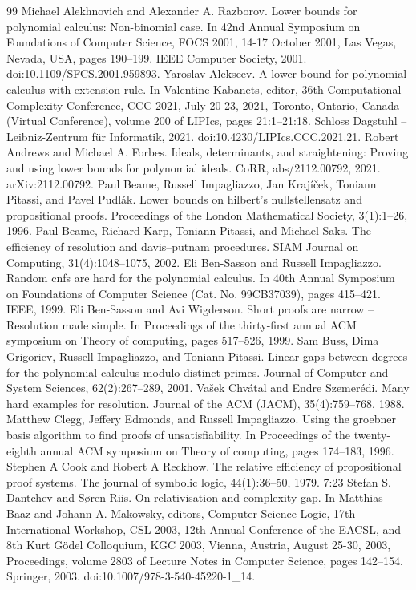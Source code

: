 \documentclass[10pt,a4paper]{article}
\begin{document}
\begin{thebibliography}{99}
 Michael Alekhnovich and Alexander A. Razborov. Lower bounds for polynomial calculus: Non-binomial case. In 42nd Annual Symposium on Foundations of Computer Science, FOCS 2001, 14-17 October 2001, Las Vegas, Nevada, USA, pages 190–199. IEEE Computer Society, 2001. doi:10.1109/SFCS.2001.959893.
 Yaroslav Alekseev. A lower bound for polynomial calculus with extension rule. In Valentine Kabanets, editor, 36th Computational Complexity Conference, CCC 2021, July 20-23, 2021, Toronto, Ontario, Canada (Virtual Conference), volume 200 of LIPIcs, pages 21:1–21:18. Schloss Dagstuhl – Leibniz-Zentrum für Informatik, 2021. doi:10.4230/LIPIcs.CCC.2021.21.
 Robert Andrews and Michael A. Forbes. Ideals, determinants, and straightening: Proving and using lower bounds for polynomial ideals. CoRR, abs/2112.00792, 2021. arXiv:2112.00792.
 Paul Beame, Russell Impagliazzo, Jan Krajíček, Toniann Pitassi, and Pavel Pudlák. Lower bounds on hilbert’s nullstellensatz and propositional proofs. Proceedings of the London Mathematical Society, 3(1):1–26, 1996.
 Paul Beame, Richard Karp, Toniann Pitassi, and Michael Saks. The efficiency of resolution and davis–putnam procedures. SIAM Journal on Computing, 31(4):1048–1075, 2002.
 Eli Ben-Sasson and Russell Impagliazzo. Random cnfs are hard for the polynomial calculus. In 40th Annual Symposium on Foundations of Computer Science (Cat. No. 99CB37039), pages 415–421. IEEE, 1999.
 Eli Ben-Sasson and Avi Wigderson. Short proofs are narrow – Resolution made simple. In Proceedings of the thirty-first annual ACM symposium on Theory of computing, pages 517–526, 1999.
 Sam Buss, Dima Grigoriev, Russell Impagliazzo, and Toniann Pitassi. Linear gaps between degrees for the polynomial calculus modulo distinct primes. Journal of Computer and System Sciences, 62(2):267–289, 2001.
 Vašek Chvátal and Endre Szemerédi. Many hard examples for resolution. Journal of the ACM (JACM), 35(4):759–768, 1988.
 Matthew Clegg, Jeffery Edmonds, and Russell Impagliazzo. Using the groebner basis algorithm to find proofs of unsatisfiability. In Proceedings of the twenty-eighth annual ACM symposium on Theory of computing, pages 174–183, 1996.
 Stephen A Cook and Robert A Reckhow. The relative efficiency of propositional proof systems. The journal of symbolic logic, 44(1):36–50, 1979. 7:23
 Stefan S. Dantchev and Søren Riis. On relativisation and complexity gap. In Matthias Baaz and Johann A. Makowsky, editors, Computer Science Logic, 17th International Workshop, CSL 2003, 12th Annual Conference of the EACSL, and 8th Kurt Gödel Colloquium, KGC 2003, Vienna, Austria, August 25-30, 2003, Proceedings, volume 2803 of Lecture Notes in Computer Science, pages 142–154. Springer, 2003. doi:10.1007/978-3-540-45220-1\_14.

\end{thebibliography}
\end{document}
